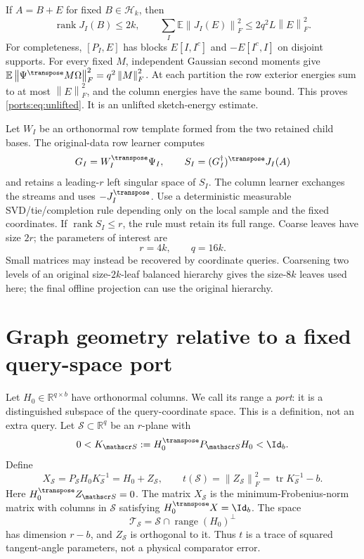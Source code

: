 \documentclass[11pt,oneside,openany,a4paper]{book}
\numberwithin{equation}{chapter}
\theoremstyle{definition}
\theoremstyle{remark}
\newcommand{\R}{\mathbb R}\newcommand{\E}{\mathbb E}\newcommand{\Prb}{\mathbb P}\newcommand{\PP}{\mathbb P}
\newcommand{\F}[1]{\left\lVert#1\right\rVert_F}
\DeclareMathOperator{\tr}{tr}\DeclareMathOperator{\rank}{rank}
\DeclareMathOperator{\ran}{range}\DeclareMathOperator{\OPT}{OPT}
\newcommand{\HH}{\mathcal H}\newcommand{\SSS}{\mathcal S}
\begin{document}
If $A=B+E$ for fixed $B\in\HH_k$, then
\begin{equation}\label{ports:eq:unlifted}
 \rank J_I(B)\le2k,\qquad
 \sum_I\E\F{J_I(E)}^2\le2q^2L\F E^2.
\end{equation}
For completeness, $[P_I,E]$ has blocks $E[I,I^c]$ and $-E[I^c,I]$ on disjoint supports. For every fixed $M$, independent Gaussian second moments give
$\E\F{\Psi^\transpose M\Omega}^2=q^2\F M^2$.
At each partition the row exterior energies sum to at most $\F E^2$, and the column energies have the same bound. This proves \eqref{ports:eq:unlifted}. It is an unlifted sketch-energy estimate.

Let $W_I$ be an orthonormal row template formed from the two retained child bases. The original-data row learner computes
\begin{equation}\label{ports:eq:learner}
 G_I=W_I^\transpose\Psi_I,\qquad
 S_I=(G_I^\dagger)^\transpose J_I(A)
\end{equation}
and retains a leading-$r$ left singular space of $S_I$. The column learner exchanges the streams and uses $-J_I^\transpose$. Use a deterministic measurable SVD/tie/completion rule depending only on the local sample and the fixed coordinates. If $\rank S_I\le r$, the rule must retain its full range. Coarse leaves have size $2r$; the parameters of interest are
\begin{equation}\label{ports:eq:parameters}
 r=4k,\qquad q=16k.
\end{equation}
Small matrices may instead be recovered by coordinate queries. Coarsening two levels of an original size-$2k$-leaf balanced hierarchy gives the size-$8k$ leaves used here; the final offline projection can use the original hierarchy.

\section{Graph geometry relative to a fixed query-space port}
Let $H_0\in\R^{q\times b}$ have orthonormal columns. We call its range a \emph{port}: it is a distinguished subspace of the query-coordinate space. This is a definition, not an extra query. Let $\mathscr S\subset\R^q$ be an $r$-plane with
\[
 0<K_{\mathscr S}:=H_0^\transpose P_{\mathscr S}H_0<\Id_b.
\]
Define
\begin{equation}\label{ports:eq:graph}
 X_{\mathscr S}=P_{\mathscr S}H_0K_{\mathscr S}^{-1}
               =H_0+Z_{\mathscr S},\qquad
 t(\mathscr S)=\F{Z_{\mathscr S}}^2
             =\tr K_{\mathscr S}^{-1}-b.
\end{equation}
Here $H_0^\transpose Z_{\mathscr S}=0$. The matrix $X_{\mathscr S}$ is the minimum-Frobenius-norm matrix with columns in $\mathscr S$ satisfying $H_0^\transpose X=\Id_b$. The space
\[
 \mathscr T_{\mathscr S}=\mathscr S\cap\ran(H_0)^\perp
\]
has dimension $r-b$, and $Z_{\mathscr S}$ is orthogonal to it. Thus $t$ is a trace of squared tangent-angle parameters, not a physical comparator error.
\end{document}

